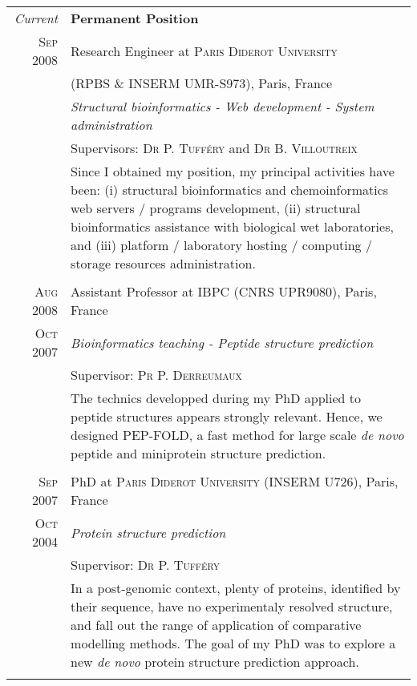 \documentclass[a4paper,10pt]{article}
\begin{document}
\begin{longtable}{r|p{11cm}}

  \emph{Current} & \textbf{Permanent Position} \\
  \textsc{Sep 2008} & Research Engineer at \textsc{Paris Diderot University} \\
  & (RPBS \& INSERM UMR-S973), Paris, France \\
  & \emph{Structural bioinformatics - Web development - System administration}\\
  & Supervisors: \textsc{Dr P. Tufféry} and \textsc{Dr B. Villoutreix}\\
  & \footnotesize{Since I obtained my position, my principal activities have been: (i) structural bioinformatics and chemoinformatics web servers / programs development, (ii) structural bioinformatics assistance with biological wet laboratories, and (iii) platform / laboratory hosting / computing / storage resources administration.  }\\
  \multicolumn{2}{c}{} \\

  \textsc{Aug 2008} & Assistant Professor at \textsc{IBPC} (CNRS UPR9080), Paris, France \\
  \textsc{Oct 2007} & \emph{Bioinformatics teaching - Peptide structure prediction}\\
  & Supervisor: \textsc{Pr P. Derreumaux}\\
  & \footnotesize{The technics developped during my PhD applied to peptide structures appears strongly relevant. Hence, we designed PEP-FOLD, a fast method for large scale \textit{de novo} peptide and miniprotein structure prediction.}\\
  \multicolumn{2}{c}{} \\

  \textsc{Sep 2007} & PhD at \textsc{Paris Diderot University} (INSERM U726), Paris, France \\
  \textsc{Oct 2004} & \emph{Protein structure prediction}\\
  & Supervisor: \textsc{Dr P. Tufféry}\\
  & \footnotesize{In a post-genomic context, plenty of proteins, identified by their sequence, have no experimentaly resolved structure, and fall out the range of application of comparative modelling methods. The goal of my PhD was to explore a new \textit{de novo} protein structure prediction approach.}\\
  \multicolumn{2}{c}{} \\


\end{longtable}
\end{document}
